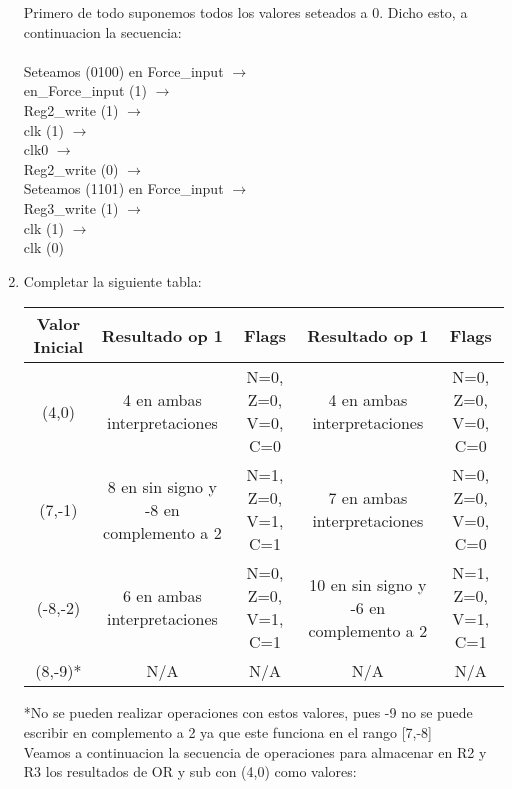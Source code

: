 \documentclass{article}
\begin{document}
\begin{enumerate}
    Primero de todo suponemos todos los valores seteados a 0. Dicho esto, a continuacion la secuencia:\\\\
    Seteamos (0100) en Force\_input $\rightarrow$\\
     en\_Force\_input (1) $\rightarrow$\\
    Reg2\_write (1) $\rightarrow$\\
    clk (1) $\rightarrow$\\ clk0 $\rightarrow$\\
    Reg2\_write (0) $\rightarrow$\\
    Seteamos (1101) en Force\_input $\rightarrow$\\
    Reg3\_write (1) $\rightarrow$\\
    clk (1) $\rightarrow$\\
    clk (0)
    \item Completar la siguiente tabla:
    \begin{center}{\renewcommand{\arraystretch}{1.5}
        \begin{tabular}{c || c | c || c | c }
            Valor Inicial & Resultado op 1 & Flags & Resultado op 1 & Flags \\ \hline
            (4,0) & 4 en ambas interpretaciones & N=0, Z=0, V=0, C=0& 4 en ambas interpretaciones & N=0, Z=0, V=0, C=0 \\
            (7,-1) & 8 en sin signo y -8 en complemento a 2& N=1, Z=0, V=1, C=1& 7 en ambas interpretaciones & N=0, Z=0, V=0, C=0\\
            (-8,-2) & 6 en ambas interpretaciones & N=0, Z=0, V=1, C=1 &10 en sin signo y -6 en complemento a 2 &        
            N=1, Z=0, V=1, C=1 \\
            (8,-9)* & N/A & N/A & N/A & N/A\\
        \end{tabular}}
    \end{center}
    *No se pueden realizar operaciones con estos valores, pues -9 no se puede escribir en complemento a 2 ya que este funciona en el rango [7,-8]\\

    Veamos a continuacion la secuencia de operaciones para almacenar en R2 y R3 los resultados de OR y sub con (4,0) como valores:


\end{enumerate}
\end{document}
